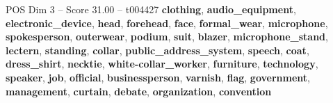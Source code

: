 \begin{textsample}{POS Dim 3 – Score 31.00 – t004427}  \label{ex:f3_pos_025}
\textbf{clothing}, \textbf{audio\_equipment}, \textbf{electronic\_device}, \textbf{head}, \textbf{forehead}, \textbf{face}, \textbf{formal\_wear}, \textbf{microphone}, \textbf{spokesperson}, \textbf{outerwear}, \textbf{podium}, \textbf{suit}, \textbf{blazer}, \textbf{microphone\_stand}, \textbf{lectern}, \textbf{standing}, \textbf{collar}, \textbf{public\_address\_system}, \textbf{speech}, \textbf{coat}, \textbf{dress\_shirt}, \textbf{necktie}, \textbf{white-collar\_worker}, \textbf{furniture}, \textbf{technology}, \textbf{speaker}, \textbf{job}, \textbf{official}, \textbf{businessperson}, \textbf{varnish}, \textbf{flag}, \textbf{government}, \textbf{management}, \textbf{curtain}, \textbf{debate}, \textbf{organization}, \textbf{convention}

\end{textsample}
